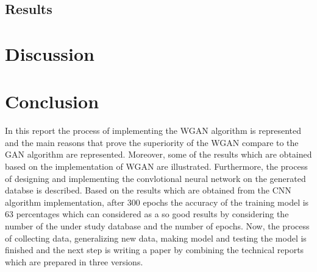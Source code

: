 \documentclass[conference]{IEEEtran}
\begin{document}
\subsection{Results}

\section{Discussion}

\section{Conclusion}
In this report the process of implementing the WGAN algorithm is represented and the main reasons that prove the superiority of the WGAN compare to the GAN algorithm are represented. Moreover, some of the results which are obtained based on the implementation of WGAN are illustrated. Furthermore, the process of designing and implementing the convlotional neural network on the generated databse is described. Based on the results which are obtained from the CNN algorithm implementation, after 300 epochs the accuracy of the training model is 63 percentages which can considered as a so good results by considering the number of the under study database and the number of epochs. Now, the process of collecting data, generalizing new data, making model and
testing the model is finished and the next step is writing a paper by combining the technical reports which are prepared in three versions.
\end{document}
